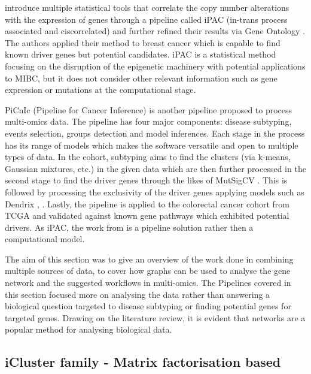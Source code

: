 \citet{Aure2013-je} introduce multiple statistical tools that correlate the copy number alterations with the expression of genes through a pipeline called iPAC (in-trans process associated and ciscorrelated) and further refined their results via Gene Ontology \cite{Carbon2018-ah}. The authors applied their method to breast cancer which is capable to find known driver genes but potential candidates. iPAC is a statistical method focusing on the disruption of the epigenetic machinery with potential applications to MIBC, but it does not consider other relevant information such as gene expression or mutations at the computational stage.


PiCnIc (Pipeline for Cancer Inference) \cite{Caravagna2016-vw} is another pipeline proposed to process multi-omics data. The pipeline has four major components: disease subtyping, events selection, groups detection and model inferences\cite{Caravagna2016-vw}. Each stage in the process has its range of models which makes the software versatile and open to multiple types of data. In the cohort, subtyping aims to find the clusters (via k-means, Gaussian mixtures, etc.) in the given data which are then further processed in the second stage to find the driver genes through the likes of MutSigCV \cite{Lawrence2013-pl}. This is followed by processing the exclusivity of the driver genes applying models such as Dendrix \cite{Vandin2012-cf}, \cite{Zhao2012-wj}. Lastly, the pipeline is applied to the colorectal cancer cohort from TCGA and validated against known gene pathways which exhibited potential drivers. As iPAC, the work from \cite{Caravagna2016-vw} is a pipeline solution rather then a computational model.

The aim of this section was to give an overview of the work done in combining multiple sources of data, to cover how graphs can be used to analyse the gene network and the suggested workflows in multi-omics. The Pipelines covered in this section focused more on analysing the data rather than answering a biological question targeted to disease subtyping or finding potential genes for targeted genes. Drawing on the literature review, it is evident that networks are a popular method for analysing biological data.

\subsection{iCluster family - Matrix factorisation based} \label{s:lit:iCluster}

